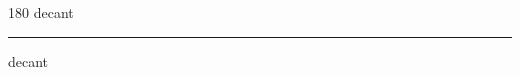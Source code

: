 
\begin{frame}
\begin{center}
\begin{turn}{180}
{\fontsize{2.5cm}{1em}\selectfont decant}
\end{turn}
\vspace{1em}\par  
\hrule
\vspace{1em}\par  
{\fontsize{2.5cm}{1em}\selectfont decant}
\end{center}
\end{frame}
